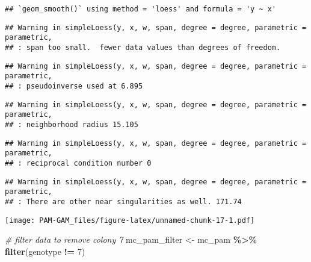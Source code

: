 \documentclass[
]{article}
\newenvironment{Shaded}{\begin{snugshade}}{\end{snugshade}}
\newcommand{\CommentTok}[1]{\textcolor[rgb]{0.56,0.35,0.01}{\textit{#1}}}
\newcommand{\DecValTok}[1]{\textcolor[rgb]{0.00,0.00,0.81}{#1}}
\newcommand{\FunctionTok}[1]{\textcolor[rgb]{0.13,0.29,0.53}{\textbf{#1}}}
\newcommand{\NormalTok}[1]{#1}
\newcommand{\OtherTok}[1]{\textcolor[rgb]{0.56,0.35,0.01}{#1}}
\newcommand{\SpecialCharTok}[1]{\textcolor[rgb]{0.81,0.36,0.00}{\textbf{#1}}}
\begin{document}
\begin{verbatim}
## `geom_smooth()` using method = 'loess' and formula = 'y ~ x'
\end{verbatim}

\begin{verbatim}
## Warning in simpleLoess(y, x, w, span, degree = degree, parametric = parametric,
## : span too small.  fewer data values than degrees of freedom.
\end{verbatim}

\begin{verbatim}
## Warning in simpleLoess(y, x, w, span, degree = degree, parametric = parametric,
## : pseudoinverse used at 6.895
\end{verbatim}

\begin{verbatim}
## Warning in simpleLoess(y, x, w, span, degree = degree, parametric = parametric,
## : neighborhood radius 15.105
\end{verbatim}

\begin{verbatim}
## Warning in simpleLoess(y, x, w, span, degree = degree, parametric = parametric,
## : reciprocal condition number 0
\end{verbatim}

\begin{verbatim}
## Warning in simpleLoess(y, x, w, span, degree = degree, parametric = parametric,
## : There are other near singularities as well. 171.74
\end{verbatim}

\texttt{[image: PAM-GAM\_files/figure-latex/unnamed-chunk-17-1.pdf]}

\begin{Shaded}
\begin{Highlighting}[]
\CommentTok{\# filter data to remove colony 7}
\NormalTok{mc\_pam\_filter }\OtherTok{\textless{}{-}}\NormalTok{ mc\_pam }\SpecialCharTok{\%\textgreater{}\%}
  \FunctionTok{filter}\NormalTok{(genotype }\SpecialCharTok{!=} \DecValTok{7}\NormalTok{)}
\end{Highlighting}
\end{Shaded}
\end{document}

